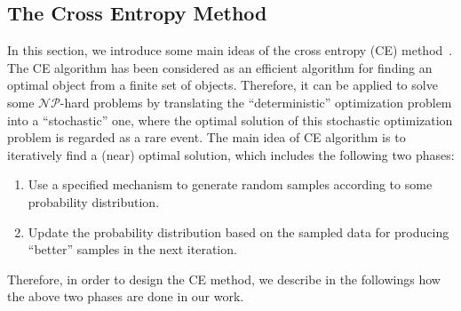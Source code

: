 \subsection{The Cross Entropy Method}
In this section, we introduce some main ideas of the cross entropy (CE) method~\cite{CE}.
The CE algorithm has been considered as an efficient algorithm for finding an optimal object from a finite set of objects.
Therefore, it can be applied to solve some $\mathcal{NP}$-hard problems by translating the ``deterministic'' optimization problem into a ``stochastic'' one, where the optimal solution of this stochastic optimization problem is regarded as a rare event.
The main idea of CE algorithm is to iteratively find a (near) optimal solution, which includes the following two phases:
\begin{enumerate}
\item Use a specified mechanism to generate random samples according to some probability distribution.
\item Update the probability distribution based on the sampled data for producing ``better'' samples in the next iteration.
\end{enumerate}
Therefore, in order to design the CE method, we describe in the followings how the above two phases are done in our work.
%
